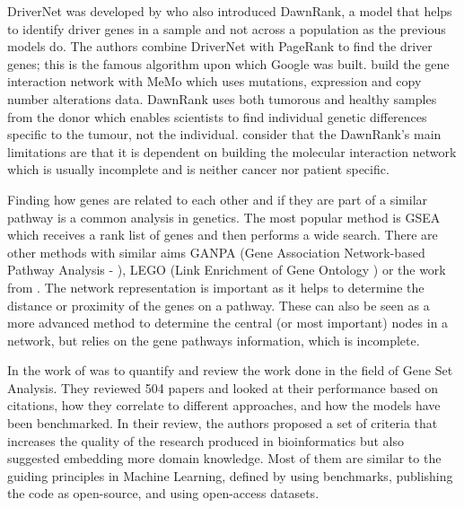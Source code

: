 DriverNet was developed by \citet{Hou2014-se} who also introduced DawnRank, a model that helps to identify driver genes in a sample and not across a population as the previous models do. The authors combine DriverNet with PageRank to find the driver genes; this is the famous algorithm upon which Google was built. \citet{Hou2014-se} build the gene interaction network with MeMo \citep{Ciriello2012-hi} which uses mutations, expression and copy number alterations data. DawnRank uses both tumorous and healthy samples from the donor which enables scientists to find individual genetic differences specific to the tumour, not the individual. \citet{Hou2014-se} consider that the DawnRank's main limitations are that it is dependent on building the molecular interaction network which is usually incomplete and is neither cancer nor patient specific. 


Finding how genes are related to each other and if they are part of a similar pathway is a common analysis in genetics. The most popular method is \gls{GSEA} which receives a rank list of genes and then performs a wide search. There are other methods with similar aims GANPA (Gene Association Network-based Pathway Analysis - \citep{Fang2012-vr}), LEGO (Link Enrichment of Gene Ontology \citep{Dong2016-zs}) or the work from \citet{Cava2018-rv}. The network representation is important as it helps to determine the distance or proximity of the genes on a pathway. These can also be seen as a more advanced method to determine the central (or most important) nodes in a network, but relies on the gene pathways information, which is incomplete.

In the work of \citep{Xie2021-al} was to quantify and review the work done in the field of Gene Set Analysis. They reviewed 504 papers and looked at their performance based on citations, how they correlate to different approaches, and how the models have been benchmarked. In their review, the authors proposed a set of criteria that increases the quality of the research produced in bioinformatics but also suggested embedding more domain knowledge. Most of them are similar to the guiding principles in Machine Learning, defined by using benchmarks, publishing the code as open-source, and using open-access datasets.



